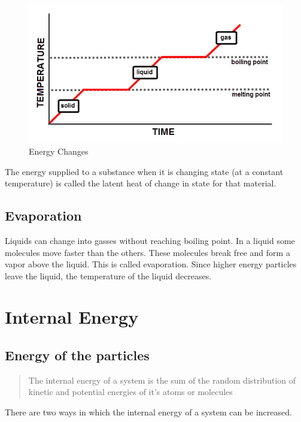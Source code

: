 \documentclass{scrbook}
\begin{document}
       \begin{figure}[h]
	       \caption{Energy Changes \cite{edplace:ech}}
               \label{energych}
               \includegraphics[width=\linewidth]{assets/EnergyChanges.jpg}
       \end{figure}

       The energy supplied to a substance when it is changing state (at a constant temperature) is called the latent heat of change in state for that material.

\subsection{Evaporation}

	Liquids can change into gasses without reaching boiling point. In a liquid some molecules move faster than the others. These molecules break free and form a vapor above the liquid. This is called evaporation. Since higher energy particles leave the liquid, the temperature of the liquid decreases.

\section{Internal Energy}

\subsection{Energy of the particles}

	\begin{quote}
		The internal energy of a system is the sum of the random distribution of kinetic and potential energies of it's atoms or molecules
	\end{quote}

	There are two ways in which the internal energy of a system can be increased.
\end{document}
